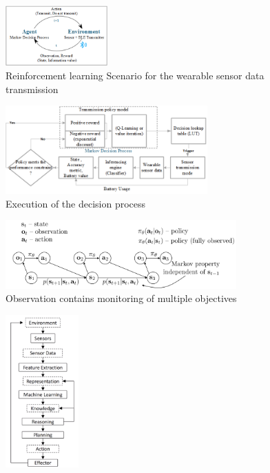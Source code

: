 \documentclass[letterpaper, 10pt, conference]{IEEEtran} %
\begin{document}
 \begin{figure}
    \centering
    \includegraphics[width=0.35\textwidth]{images/RL.png}
    \caption{Reinforcement learning Scenario for the wearable sensor data transmission}
  \end{figure}
  \begin{figure}
    \centering
      \includegraphics[width=0.69\textwidth]{images/MDP3.png}
\caption{Execution of the decision process}
    \label{fig:confusion}
  \end{figure}
  

  \begin{figure}
    \centering
    \includegraphics[width=0.79\textwidth]{images/Policy.PNG}
\caption{Observation contains monitoring of multiple objectives}
    \label{fig:markov}
  \end{figure}
 \begin{figure}
    \centering
    \includegraphics[width=0.25\textwidth]{images/reiforcement_learning.png}
\caption{}
    \label{fig:markov}
  \end{figure} 
\end{document}
